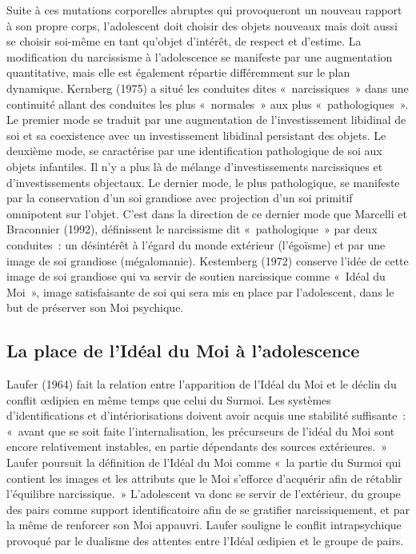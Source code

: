 \documentclass[12pt, a4paper]{book}
\begin{document}
\begin{spacing}{1.5}
Suite à ces mutations corporelles abruptes qui provoqueront un nouveau rapport à son propre corps, l'adolescent doit choisir des objets nouveaux mais doit aussi se choisir soi-même en tant qu'objet d'intérêt, de respect et d'estime. La modification du narcissisme à l'adolescence se manifeste par une augmentation quantitative, mais elle est également répartie différemment sur le plan dynamique. Kernberg (1975) a situé les conduites dites « narcissiques » dans une continuité allant des conduites les plus « normales » aux plus « pathologiques ». Le premier mode se traduit par une augmentation de l'investissement libidinal de soi et sa coexistence avec un investissement libidinal persistant des objets. Le deuxième mode, se caractérise par une identification pathologique de soi aux objets infantiles. Il n'y a plus là de mélange d'investissements narcissiques et d'investissements objectaux. Le dernier mode, le plus pathologique, se manifeste par la conservation d'un soi grandiose avec projection d'un soi primitif omnipotent sur l'objet. C'est dans la direction de ce dernier mode que Marcelli et Braconnier (1992), définissent le narcissisme dit « pathologique » par deux conduites : un désintérêt à l'égard du monde extérieur (l'égoïsme) et par une image de soi grandiose (mégalomanie). Kestemberg (1972) conserve l'idée de cette image de soi grandiose qui va servir de soutien narcissique comme « Idéal du Moi », image satisfaisante de soi qui sera mis en place par l'adolescent, dans le but de préserver son Moi psychique.

\subsection{La place de l'Idéal du Moi à l'adolescence}

Laufer (1964) fait la relation entre l'apparition de l'Idéal du Moi et le déclin du conflit œdipien en même temps que celui du Surmoi. Les systèmes d'identifications et d'intériorisations doivent avoir acquis une stabilité suffisante : « avant que se soit faite l'internalisation, les précurseurs de l'idéal du Moi sont encore relativement instables, en partie dépendants des sources extérieures. » Laufer poursuit la définition de l'Idéal du Moi comme « la partie du Surmoi qui contient les images et les attributs que le Moi s'efforce d'acquérir afin de rétablir l'équilibre narcissique. » L'adolescent va donc se servir de l'extérieur, du groupe des pairs comme support identificatoire afin de se gratifier narcissiquement, et par la même de renforcer son Moi appauvri. Laufer souligne le conflit intrapsychique provoqué par le dualisme des attentes entre l'Idéal œdipien et le groupe de pairs.


\end{spacing}
\end{document}

